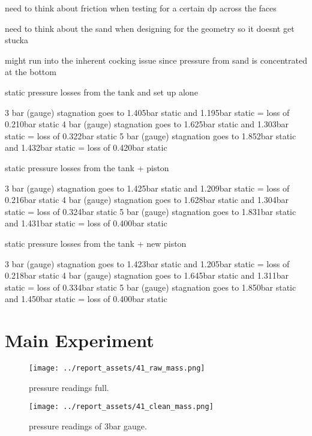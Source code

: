 need to think about friction when testing for a certain dp across the faces

need to think about the sand when designing for the geometry so it doesnt get stucka

might run into the inherent cocking issue since pressure from sand is concentrated at the bottom

static pressure losses from the tank and set up alone

3 bar (gauge) stagnation goes to 1.405bar static and 1.195bar static = loss of 0.210bar static
4 bar (gauge) stagnation goes to 1.625bar static and 1.303bar static = loss of 0.322bar static
5 bar (gauge) stagnation goes to 1.852bar static and 1.432bar static = loss of 0.420bar static

static pressure losses from the tank + piston

3 bar (gauge) stagnation goes to 1.425bar static and 1.209bar static = loss of 0.216bar static
4 bar (gauge) stagnation goes to 1.628bar static and 1.304bar static = loss of 0.324bar static
5 bar (gauge) stagnation goes to 1.831bar static and 1.431bar static = loss of 0.400bar static

static pressure losses from the tank + new piston

3 bar (gauge) stagnation goes to 1.423bar static and 1.205bar static = loss of 0.218bar static
4 bar (gauge) stagnation goes to 1.645bar static and 1.311bar static = loss of 0.334bar static
5 bar (gauge) stagnation goes to 1.850bar static and 1.450bar static = loss of 0.400bar static


\section{Main Experiment}
\begin{figure}[htbp]
    \centering

    \begin{minipage}{0.45\textwidth}
        \centering
        \texttt{[image: ../report\_assets/41\_raw\_mass.png]}
        \caption{pressure readings full.}\label{fig:41_raw_mass}
    \end{minipage}
    \hfill
    \begin{minipage}{0.45\textwidth}
        \centering
        \texttt{[image: ../report\_assets/41\_clean\_mass.png]}
        \caption{pressure readings of 3bar gauge.}\label{fig:41_mass}
    \end{minipage}

\end{figure}


